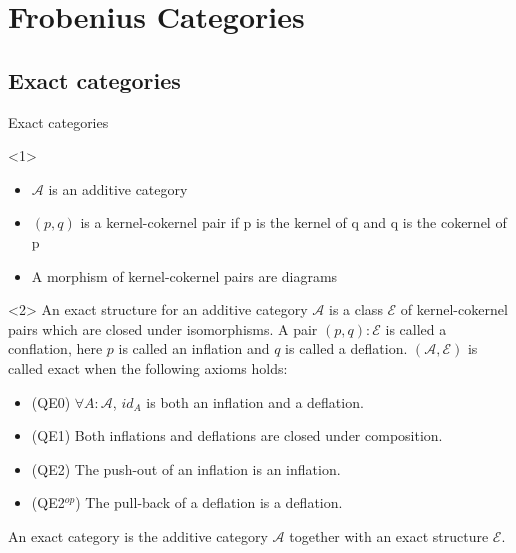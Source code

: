 \documentclass{beamer}
\begin{document}
    \section{Frobenius Categories}
        \subsection{Exact categories}
            \begin{frame}{Exact categories}
                \begin{onlyenv}<1>
                    \begin{definition}
                        \begin{itemize}
                            \item $\mathcal{A}$ is an additive category
                            \item $(p,q)$ is a kernel-cokernel pair if p is the kernel of q and q is the cokernel of p
                            \item A morphism of kernel-cokernel pairs are diagrams 
                        \end{itemize}
                        \begin{center}
                        \end{center}
                    \end{definition}
                \end{onlyenv}
                \begin{onlyenv}<2>
                    An exact structure for an additive category $\mathcal{A}$ is a class $\mathcal{E}$ of kernel-cokernel pairs which are closed under isomorphisms. A pair $(p,q):\mathcal{E}$ is called a conflation, here $p$ is called an inflation and $q$ is called a deflation. $(\mathcal{A},\mathcal{E})$ is called exact when the following axioms holds:
                    \begin{itemize}
                        \item (QE0) $\forall A:\mathcal{A}$, $id_A$ is both an inflation and a deflation.
                        \item (QE1) Both inflations and deflations are closed under composition.
                        \item (QE2) The push-out of an inflation is an inflation.
                        \item (QE2$^{op}$) The pull-back of a deflation is a deflation.
                    \end{itemize}

                    An exact category is the additive category $\mathcal{A}$ together with an exact structure $\mathcal{E}$.
                \end{onlyenv}
            \end{frame}
\end{document}
